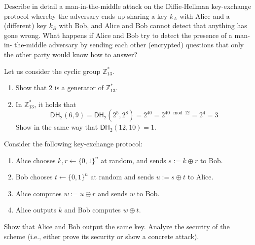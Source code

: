\documentclass[a4paper,10pt,landscape,twocolumn]{scrartcl}
\begin{document}
\begin{exercise}
 \begin{subex}
Describe in detail a man-in-the-middle attack on the Diffie-Hellman key-exchange protocol whereby the adversary ends up sharing a key $k_A$ with Alice and a (different) key $k_B$ with Bob, and Alice and Bob cannot detect that anything has gone wrong.
What happens if Alice and Bob try to detect the presence of a man-in- the-middle adversary by sending each other (encrypted) questions that only the other party would know how to answer?
\end{subex}

\begin{subex}
Let us consider the cyclic group $\mathbb{Z}_{13}^*$.
\begin{enumerate}
\item Show that 2 is a generator of $\mathbb{Z}_{13}^*$.
\item In $\mathbb{Z}_{13}^*$, it holds that 
\[
\mathsf{DH}_2(6,9) = \mathsf{DH}_2(2^5, 2^8) = 2^{40} = 2^{40 \mod 12} = 2^4 = 3
\]
Show in the same way that $\mathsf{DH}_2(12,10)=1$.
\end{enumerate}

\end{subex}

\end{exercise}

\begin{exercise}
  Consider the following key-exchange protocol:
\begin{enumerate}
\item Alice chooses $k,r \leftarrow \{0,1\}^n$ at random, and sends $s := k \oplus r$ to Bob.
\item Bob chooses $t\leftarrow \{0,1\}^n$ at random and sends
  $u:=s \oplus t$ to Alice.
\item Alice computes $w := u \oplus r$ and sends $w$ to Bob.
\item Alice outputs $k$ and Bob computes $w \oplus t$.
\end{enumerate}
Show that Alice and Bob output the same key. Analyze the security of
the scheme (i.e., either prove its security or show a concrete
attack).
\end{exercise}
\end{document}
